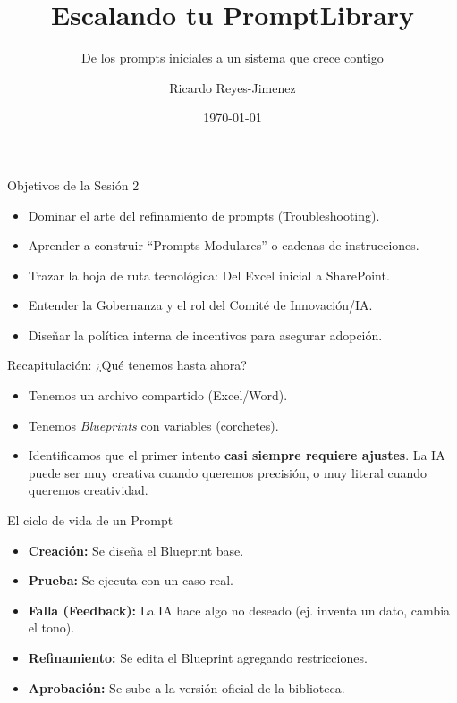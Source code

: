 \documentclass[aspectratio=169]{beamer}
\title[ Escalando tu PromptLibrary]{ Escalando tu PromptLibrary}
\subtitle{ De los prompts iniciales a un sistema que crece contigo}
\author{Ricardo Reyes-Jimenez}
\institute{Universidad de La Sabana}
\date{\today}
\begin{document}
\begin{frame}
  \titlepage
\end{frame}

\usebackgroundtemplate{}


\begin{frame}{Objetivos de la Sesión 2}

\begin{itemize}
  \item Dominar el arte del refinamiento de prompts (Troubleshooting).
  \item Aprender a construir ``Prompts Modulares'' o cadenas de instrucciones.
  \item Trazar la hoja de ruta tecnológica: Del Excel inicial a SharePoint.
  \item Entender la Gobernanza y el rol del Comité de Innovación/IA.
  \item Diseñar la política interna de incentivos para asegurar adopción.
\end{itemize}
\end{frame}

\begin{frame}{Recapitulación: ¿Qué tenemos hasta ahora?}

\begin{itemize}
  \item Tenemos un archivo compartido (Excel/Word).
  \item Tenemos \textit{Blueprints} con variables (corchetes).
  \item Identificamos que el primer intento \textbf{casi siempre requiere ajustes}. La IA puede ser muy creativa cuando queremos precisión, o muy literal cuando queremos creatividad.
\end{itemize}
\end{frame}

\begin{frame}{El ciclo de vida de un Prompt}

\begin{itemize}
  \item \textbf{Creación:} Se diseña el Blueprint base.
  \item \textbf{Prueba:} Se ejecuta con un caso real.
  \item \textbf{Falla (Feedback):} La IA hace algo no deseado (ej. inventa un dato, cambia el tono).
  \item \textbf{Refinamiento:} Se edita el Blueprint agregando restricciones.
  \item \textbf{Aprobación:} Se sube a la versión oficial de la biblioteca.
\end{itemize}
\end{frame}
\end{document}
